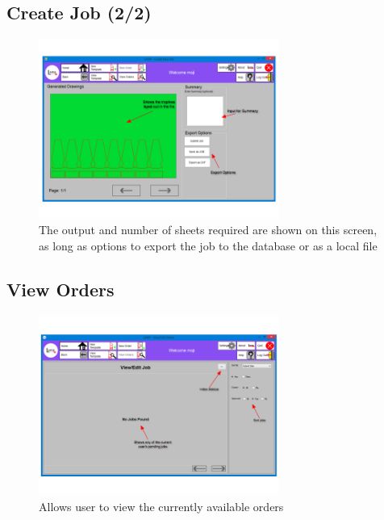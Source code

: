 \documentclass[oneside,openany,11pt,a4paper]{report}
\begin{document}
\subsection{Create Job (2/2)}
\begin{figure}[H]
	\centering
	\includegraphics[width=0.7\textwidth]{screen/submitjob.png}
	\caption{The output and number of sheets required are shown on this screen, as long as options to export the job to the database or as a local file}
\end{figure}

\subsection{View Orders}
\begin{figure}[H]
	\centering
	\includegraphics[width=0.7\textwidth]{screen/vieworders.png}
	\caption{Allows user to view the currently available orders}
\end{figure}
\end{document}
